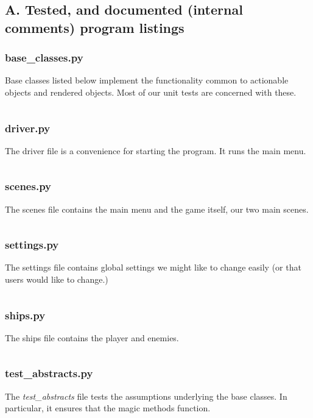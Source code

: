 %
\subsection*{A. Tested, and documented (internal comments) program listings}

    \subsubsection*{base\_classes.py}
        Base classes listed below implement the functionality common to
        actionable objects and rendered objects.  Most of our unit tests
        are concerned with these.
        \inputminted{python}{../assets/base_classes.py}

    \subsubsection*{driver.py}
        The driver file is a convenience for starting the program.  It
        runs the main menu.
        \inputminted{python}{../assets/driver.py}

    \subsubsection*{scenes.py}
        The scenes file contains the main menu and the game itself, our
        two main scenes.
        \inputminted{python}{../assets/scenes.py}

    \subsubsection*{settings.py}
        The settings file contains global settings we might like to change
        easily (or that users would like to change.)
        \inputminted{python}{../assets/settings.py}

    \subsubsection*{ships.py}
        The ships file contains the player and enemies.
        \inputminted{python}{../assets/ships.py}

    \subsubsection*{test\_abstracts.py}
        The \textit{test\_abstracts} file tests the assumptions underlying
        the base classes.  In particular, it ensures that the magic methods
        function.
        \inputminted{python}{../assets/test_abstracts.py}

